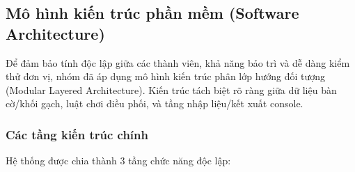 \subsection{Mô hình kiến trúc phần mềm (Software Architecture)}
\label{sec:architecture}

Để đảm bảo tính độc lập giữa các thành viên, khả năng bảo trì và dễ dàng kiểm thử đơn vị, nhóm đã áp dụng mô hình kiến trúc phân lớp hướng đối tượng (Modular Layered Architecture). Kiến trúc tách biệt rõ ràng giữa dữ liệu bàn cờ/khối gạch, luật chơi điều phối, và tầng nhập liệu/kết xuất console.

\subsubsection{Các tầng kiến trúc chính}
Hệ thống được chia thành 3 tầng chức năng độc lập:
